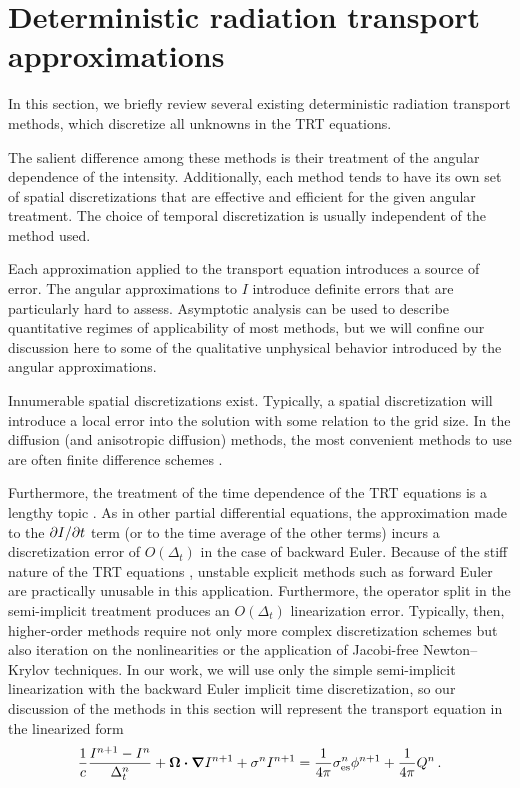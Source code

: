 \section{Deterministic radiation transport approximations}
\label{sec:bgApproxMethods}

In this section, we briefly review several existing deterministic radiation
transport methods, which discretize all unknowns in the TRT equations.

The salient difference among these methods is their treatment of
the angular dependence of the intensity. Additionally, each method tends to have
its own set of spatial discretizations that are effective and efficient for the
given angular treatment. The choice of temporal discretization is usually
independent of the method used.

Each approximation applied to the transport
equation introduces a source of error. The angular approximations to $I$
introduce definite errors that are particularly hard to assess. Asymptotic
analysis can be used to describe quantitative regimes of applicability of most
methods, but we will confine our discussion here to some of the qualitative
unphysical behavior introduced by the angular approximations.

Innumerable spatial discretizations exist. Typically, a
spatial discretization will introduce a local error into the solution with some
relation to the grid size. In the diffusion (and anisotropic diffusion) methods,
the most convenient methods to use are often finite difference schemes
\cite{Lev2007}.

Furthermore, the treatment of the time dependence of the TRT equations is a lengthy
topic \cite{Low2004}. As in other partial differential equations, the
approximation made to the
${\partial I}/{\partial t}$ term (or to the time average of the other terms) incurs a
discretization error of $O(\Delta_t)$ in the case of backward Euler.
Because of the stiff nature of the TRT equations \cite{Kno2003}, unstable explicit
methods such as forward Euler are practically unusable in this application.
Furthermore, the operator split in the semi-implicit treatment produces an
$O(\Delta_t)$ linearization error. Typically, then,
higher-order methods require not only more complex discretization schemes but also
iteration on the nonlinearities or the
application of Jacobi-free Newton--Krylov techniques. In our work, we will use
only the simple semi-implicit linearization with the backward Euler implicit time
discretization, so our discussion of the methods in this section will represent
the transport equation in the linearized form
\begin{equation}\label{eq:siTransport}
  \frac{1}{c} \frac{I^{n+1} - I^n}{\Delta_t^n}
  + \bm{\Omega} \bm{\cdot} \bm{\nabla} I^{n+1}
  + \sigma^n I^{n+1}
  = \frac{1}{4\pi} \sigma_\mathrm{es}^n \phi^{n+1}
  + \frac{1}{4\pi} Q^n\,.
\end{equation}

